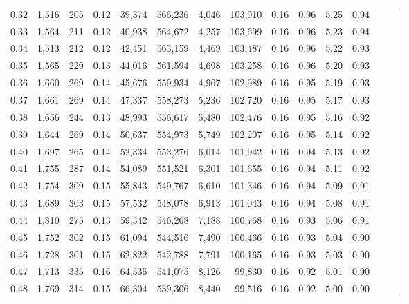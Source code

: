 \begin{tabular}{rrrrrrrrrrrrrrr}
0.32 &   1,516 &     205 &  0.12 &   39,374 &  566,236 &    4,046 &  103,910 &  0.16 &  0.96 &  5.25 &      0.94 \\
0.33 &   1,564 &     211 &  0.12 &   40,938 &  564,672 &    4,257 &  103,699 &  0.16 &  0.96 &  5.23 &      0.94 \\
0.34 &   1,513 &     212 &  0.12 &   42,451 &  563,159 &    4,469 &  103,487 &  0.16 &  0.96 &  5.22 &      0.93 \\
0.35 &   1,565 &     229 &  0.13 &   44,016 &  561,594 &    4,698 &  103,258 &  0.16 &  0.96 &  5.20 &      0.93 \\
0.36 &   1,660 &     269 &  0.14 &   45,676 &  559,934 &    4,967 &  102,989 &  0.16 &  0.95 &  5.19 &      0.93 \\
0.37 &   1,661 &     269 &  0.14 &   47,337 &  558,273 &    5,236 &  102,720 &  0.16 &  0.95 &  5.17 &      0.93 \\
0.38 &   1,656 &     244 &  0.13 &   48,993 &  556,617 &    5,480 &  102,476 &  0.16 &  0.95 &  5.16 &      0.92 \\
0.39 &   1,644 &     269 &  0.14 &   50,637 &  554,973 &    5,749 &  102,207 &  0.16 &  0.95 &  5.14 &      0.92 \\
0.40 &   1,697 &     265 &  0.14 &   52,334 &  553,276 &    6,014 &  101,942 &  0.16 &  0.94 &  5.13 &      0.92 \\
0.41 &   1,755 &     287 &  0.14 &   54,089 &  551,521 &    6,301 &  101,655 &  0.16 &  0.94 &  5.11 &      0.92 \\
0.42 &   1,754 &     309 &  0.15 &   55,843 &  549,767 &    6,610 &  101,346 &  0.16 &  0.94 &  5.09 &      0.91 \\
0.43 &   1,689 &     303 &  0.15 &   57,532 &  548,078 &    6,913 &  101,043 &  0.16 &  0.94 &  5.08 &      0.91 \\
0.44 &   1,810 &     275 &  0.13 &   59,342 &  546,268 &    7,188 &  100,768 &  0.16 &  0.93 &  5.06 &      0.91 \\
0.45 &   1,752 &     302 &  0.15 &   61,094 &  544,516 &    7,490 &  100,466 &  0.16 &  0.93 &  5.04 &      0.90 \\
0.46 &   1,728 &     301 &  0.15 &   62,822 &  542,788 &    7,791 &  100,165 &  0.16 &  0.93 &  5.03 &      0.90 \\
0.47 &   1,713 &     335 &  0.16 &   64,535 &  541,075 &    8,126 &   99,830 &  0.16 &  0.92 &  5.01 &      0.90 \\
0.48 &   1,769 &     314 &  0.15 &   66,304 &  539,306 &    8,440 &   99,516 &  0.16 &  0.92 &  5.00 &      0.90 \\

\end{tabular}
